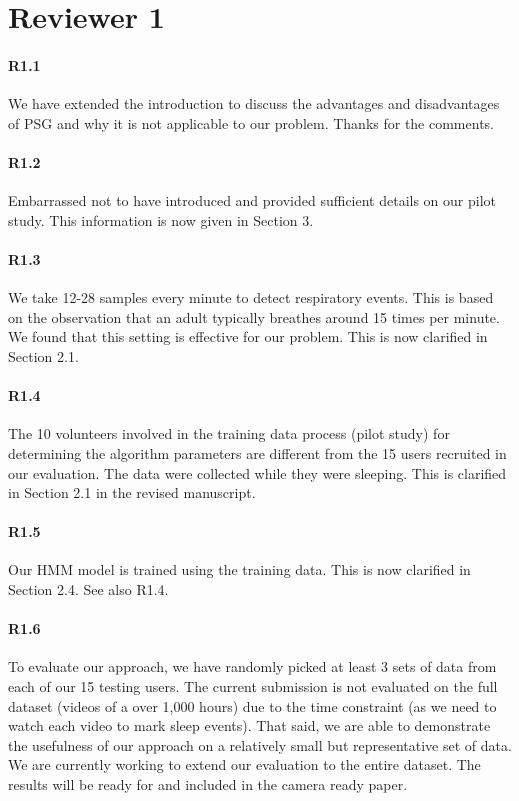 \section*{Reviewer 1}

\paragraph{R1.1} We have extended the introduction to discuss the advantages and disadvantages of PSG and why it is not applicable to our
problem. Thanks for the comments.

\paragraph{R1.2} Embarrassed not to have introduced and provided sufficient details on our pilot study. This information is now given in Section 3.

\paragraph{R1.3} We take 12-28 samples every minute to detect respiratory events. This is based on the observation that an adult typically
breathes around 15 times per minute. We found that this setting is effective for our problem. This is now clarified in Section 2.1.

\paragraph{R1.4} The 10 volunteers involved in the training data process (pilot study) for determining the algorithm parameters are different from the 15 users recruited in our
evaluation. The data were collected while they were sleeping. This is clarified in Section 2.1 in the revised manuscript.

\paragraph{R1.5} Our HMM model is trained using the training data. This is now clarified in Section 2.4. See also R1.4.
\vspace{-2mm}
\paragraph{R1.6} To evaluate our approach, we have randomly picked at least 3 sets of data from each of our 15 testing users.
The current submission is not evaluated on the full dataset (videos of a over 1,000 hours) due to the time constraint (as we need to watch
each video to mark sleep events). That said, we are able to demonstrate the usefulness of our approach on a relatively small but
representative set of data. We are currently working to extend our evaluation to the entire dataset. The results will be ready for and
included in the camera ready paper.

